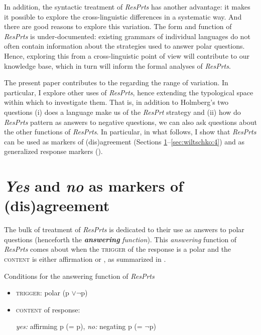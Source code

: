 \documentclass[output=paper]{LSP/langsci}
\begin{document}
In addition, the syntactic treatment of \textit{ResPrts} has another advantage: it makes it possible to explore the cross-linguistic differences in a systematic way. And there are good reasons to explore this variation. The form and function of \textit{ResPrts} is under-documented: existing grammars of individual languages do not often contain information about the strategies used to answer polar questions. Hence, exploring this  from a cross-linguistic point of view will contribute to our knowledge base, which in turn will inform the formal analyses of \textit{ResPrts}. 

The present paper contributes to the  regarding the range of variation. In particular, I explore other uses of \textit{ResPrts}, hence extending the typological space within which to investigate them. That is, in addition to Holmberg’s two questions 
(i) does a language make us of the \textit{ResPrt} strategy and 
(ii) how do \textit{ResPrts} pattern as answers to negative questions, we can also ask questions about the other functions of \textit{ResPrts}. In particular, in what follows, I show that \textit{ResPrts} can be used as markers of (dis)agreement (Sections \ref{sec:wiltschko:3}--\ref{sec:wiltschko:4}) and as generalized response markers (). 

\section{\textit{Yes} and \textit{no} as markers of (dis)agreement}\label{sec:wiltschko:3}

The bulk of  treatment of \textit{ResPrts} is dedicated to their use as answers to polar questions (henceforth the \textbf{\textit{answering}} \textit{function}). This \textit{answering} function of \textit{ResPrts} comes about when the \textsc{trigger} of the response is a polar  and the \textsc{content} is either affirmation or , as summarized in .

\ea\label{ex:wiltschko:15}
Conditions for the answering function of \textit{ResPrts}
\begin{itemize}
 \item[] \textsc{trigger:} polar  (p $\lor ¬$p)
 \item[] \textsc{content} of response:
	 \begin{xlisti}
	  \ex \textit{yes:} affirming p (= p),
          \ex \textit{no:}   negating p (= $¬$p)
	 \end{xlisti}
\end{itemize}
\z
\end{document}
